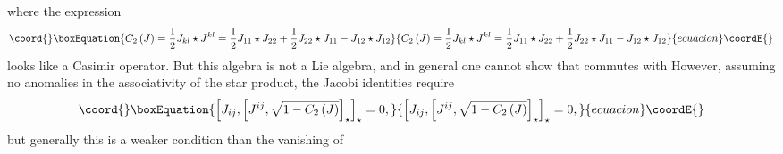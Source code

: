 \documentclass[a4paper,12pt]{article}
\begin{document}
where the expression
\begin{equation}\coord{}\boxEquation{
C_{2}\left( J\right) =\frac{1}{2}J_{kl}\star J^{kl}=\frac{1}{2}J_{11}\star
J_{22}+\frac{1}{2}J_{22}\star J_{11}-J_{12}\star J_{12}
}{
C_{2}\left( J\right) =\frac{1}{2}J_{kl}\star J^{kl}=\frac{1}{2}J_{11}\star
J_{22}+\frac{1}{2}J_{22}\star J_{11}-J_{12}\star J_{12}
}{ecuacion}\coordE{}\end{equation}
looks like a Casimir operator. But this algebra is not a Lie algebra, and in
general one cannot show that \coordHE{} commutes with \coordHE{}
However, assuming no anomalies in the associativity of the star product, the
Jacobi identities \coordHE{} require
\begin{equation}\coord{}\boxEquation{
\left[ J_{ij},\left[ J^{ij},\sqrt{1-C_{2}\left( J\right) }\right]
_{\star } \right] _{\star }=0,  \label{assoc}
}{
\left[ J_{ij},\left[ J^{ij},\sqrt{1-C_{2}\left( J\right) }\right]
_{\star } \right] _{\star }=0,  }{ecuacion}\coordE{}\end{equation}
but generally this is a weaker condition than the vanishing of \coordHE{}
\end{document}
